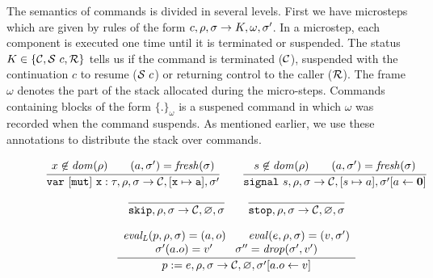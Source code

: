 The semantics of commands is divided in several levels. First we have microsteps which are given
by rules of the form $c,\rho,\sigma \rightarrow K, \omega,\heap'$. In a microstep, each component
is executed one time until it is terminated or suspended.
The status $K \in\{\continue, \suspend~c, \ret\}$ tells us if the command is terminated ($\continue$), suspended
with the continuation $c$ to resume ($\suspend~c$) or returning control to the caller ($\ret$).
The frame $\omega$ denotes the part of the stack allocated during the micro-steps. Commands containing blocks
of the form $\{.\}_\omega$ is a suspened command in which $\omega$ was recorded when the command suspends.
As mentioned earlier, we use these annotations to distribute the stack over commands.
\begin{figure}
  $$
    \begin{array}{c}
      \cfrac{
        x \not \in \dom (\rho) \qquad 
        (\address,\heap') = {\mathit{fresh}}(\heap)
      }{
        \variable~[mut]~x:\tau, \env,\heap \rightarrow
        \continue, [x\mapsto \address], \heap'
      }
      \qquad
      \cfrac{
        s \not \in \dom(\rho) \qquad 
        (\address,\heap') = {\mathit{fresh}}(\heap)
      }{
        \dsignal~\sig, \env, \heap\rightarrow
        \continue, [\sig \mapsto \address], \heap'[\address \leftarrow \absent]
      }
      \\
      \cfrac{}{\skipp,\env ,\sigma \rightarrow \continue, \varnothing,\sigma}
      \qquad{}
      \cfrac{}{\stopp,\env ,\sigma \rightarrow \continue, \varnothing,\sigma}
      \\\\
      \cfrac{
        \begin{array}{c}
          \evalLeft{p}{\env}{\heap} = (\address,o) \qquad
          \eval{e}{\env}{\heap} = (v, \heap')\\
          \heap'(a.o) = v' \qquad \heap'' = {\mathit{drop}}(\heap',v')
        \end{array}
      }{
        p := e, \env,\heap \rightarrow
        \continue, \varnothing,\heap'[\address.o \leftarrow v]
      }

\end{array}$$
\end{figure}
